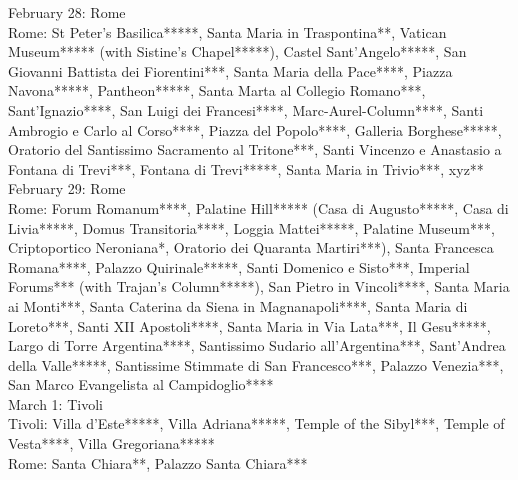 February 28: Rome\\%

Rome: St Peter's Basilica*****, Santa Maria in Traspontina**, Vatican Museum***** (with Sistine's Chapel*****), Castel Sant'Angelo*****, San Giovanni Battista dei Fiorentini***, Santa Maria della Pace****, Piazza Navona*****, Pantheon*****, Santa Marta al Collegio Romano***, Sant'Ignazio****, San Luigi dei Francesi****, Marc-Aurel-Column****, Santi Ambrogio e Carlo al Corso****, Piazza del Popolo****, Galleria Borghese*****, Oratorio del Santissimo Sacramento al Tritone***, Santi Vincenzo e Anastasio a Fontana di Trevi***, Fontana di Trevi*****, Santa Maria in Trivio***, xyz**\\%

February 29: Rome\\%

Rome: Forum Romanum****, Palatine Hill***** (Casa di Augusto*****, Casa di Livia*****, Domus Transitoria****, Loggia Mattei*****, Palatine Museum***, Criptoportico Neroniana*, Oratorio dei Quaranta Martiri***), Santa Francesca Romana****, Palazzo Quirinale*****, Santi Domenico e Sisto***, Imperial Forums*** (with Trajan's Column*****), San Pietro in Vincoli****, Santa Maria ai Monti***, Santa Caterina da Siena in Magnanapoli****, Santa Maria di Loreto***, Santi XII Apostoli****, Santa Maria in Via Lata***, Il Gesu*****, Largo di Torre Argentina****, Santissimo Sudario all'Argentina***, Sant'Andrea della Valle*****, Santissime Stimmate di San Francesco***, Palazzo Venezia***, San Marco Evangelista al Campidoglio****\\%

March 1: Tivoli\\

Tivoli: Villa d'Este*****, Villa Adriana*****, Temple of the Sibyl***, Temple of Vesta****, Villa Gregoriana*****\\%
Rome: Santa Chiara**, Palazzo Santa Chiara***\\%

